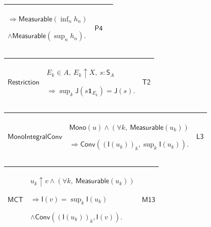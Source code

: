 \documentclass[11pt]{amsart}
\newlength{\FTCThreeColumnBody}
\begin{document}
{\begin{tabular}{|@{}>{\centering\arraybackslash}m{0.251968\FTCThreeColumnBody}|>{\centering\arraybackslash}m{0.590551\FTCThreeColumnBody}|>{\centering\arraybackslash}m{0.157480\FTCThreeColumnBody}|}
$\displaystyle \Rightarrow\textsf{Measurable}(\inf_n h_n)$\par
$\displaystyle \land\textsf{Measurable}(\sup_n h_n).$ & \hyperlink{proof:P4}{$\displaystyle \textsf{P4}$}\\ \hline
\end{tabular}%
\par\setlength{\parskip}{0pt}\nointerlineskip
\noindent
\begin{tabular}{|@{}>{\centering\arraybackslash}m{0.251968\FTCThreeColumnBody}|>{\centering\arraybackslash}m{0.590551\FTCThreeColumnBody}|>{\centering\arraybackslash}m{0.157480\FTCThreeColumnBody}|}\hline
\hypertarget{lem:Restriction}{$\displaystyle \textsf{Restriction}$} & $\displaystyle E_k\in A,\ E_k\uparrow X,\ s:\textsf{S}_A$\par
$\displaystyle \Rightarrow\sup_k\textsf{J}(s\mathbf1_{E_k})=\textsf{J}(s).$ & \hyperlink{proof:T2}{$\displaystyle \textsf{T2}$}\\ \hline
\end{tabular}%
\par\setlength{\parskip}{0pt}\nointerlineskip
\noindent
\begin{tabular}{|@{}>{\centering\arraybackslash}m{0.251968\FTCThreeColumnBody}|>{\centering\arraybackslash}m{0.590551\FTCThreeColumnBody}|>{\centering\arraybackslash}m{0.157480\FTCThreeColumnBody}|}\hline
\hypertarget{lem:MonoIntegralConv}{$\displaystyle \textsf{MonoIntegralConv}$} & $\displaystyle \textsf{Mono}(u)\land(\forall k,\ \textsf{Measurable}(u_k))$\par
$\displaystyle \Rightarrow\textsf{Conv}((\textsf{I}(u_k))_k,\sup_k\textsf{I}(u_k)).$ & \hyperlink{proof:L3}{$\displaystyle \textsf{L3}$}\\ \hline
\end{tabular}%
\par\setlength{\parskip}{0pt}\nointerlineskip
\noindent
\begin{tabular}{|@{}>{\centering\arraybackslash}m{0.251968\FTCThreeColumnBody}|>{\centering\arraybackslash}m{0.590551\FTCThreeColumnBody}|>{\centering\arraybackslash}m{0.157480\FTCThreeColumnBody}|}\hline
\hypertarget{lem:MCT}{$\displaystyle \textsf{MCT}$} & $\displaystyle u_k\uparrow v\land(\forall k,\ \textsf{Measurable}(u_k))$\par
$\displaystyle \Rightarrow\textsf{I}(v)=\sup_k\textsf{I}(u_k)$\par
$\displaystyle \land\textsf{Conv}((\textsf{I}(u_k))_k,\textsf{I}(v)).$ & \hyperlink{proof:M13}{$\displaystyle \textsf{M13}$}\\ \hline
\end{tabular}%
\par
}
\end{document}
